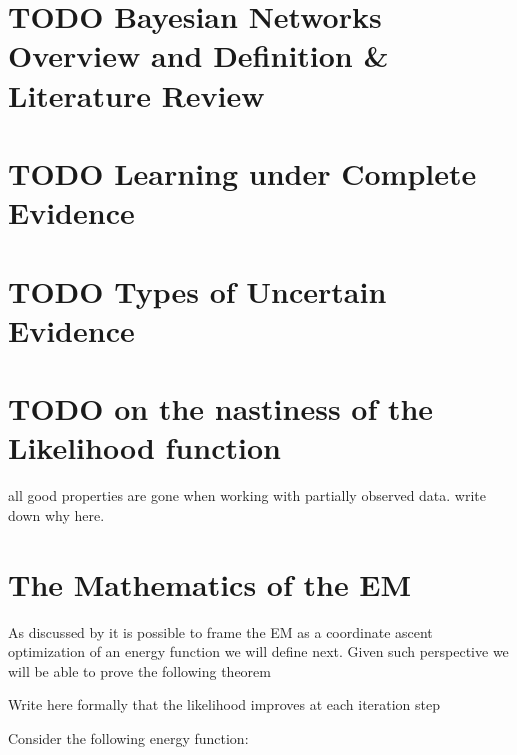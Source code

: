\documentclass[11pt]{article}
\begin{document}
\begin{article}

\maketitle

\newpage

\tableofcontents

\newpage

\section{{\bfseries\sffamily TODO} Bayesian Networks Overview and Definition \& Literature Review}
\label{sec:org890149a}

\section{{\bfseries\sffamily TODO} Learning under Complete Evidence}
\label{sec:org559df44}

\section{{\bfseries\sffamily TODO} Types of Uncertain Evidence}
\label{sec:org6f0678e}

\section{{\bfseries\sffamily TODO} on the nastiness of the Likelihood function}
\label{sec:org0d7b5a5}

all good properties are gone when working with partially observed
data. write down why here. 


\section{The Mathematics of the EM}
\label{sec:orgb0135ab}
As discussed by \cite{koller2009probabilistic} it is possible to frame
the EM as a coordinate ascent optimization of an energy function we
will define next. Given such perspective we will be able to prove the
following theorem

\begin{theorem}\label{thm:one}
Write here formally that the likelihood improves at each iteration step
\end{theorem}

Consider the following energy function:


\end{article}
\end{document}
